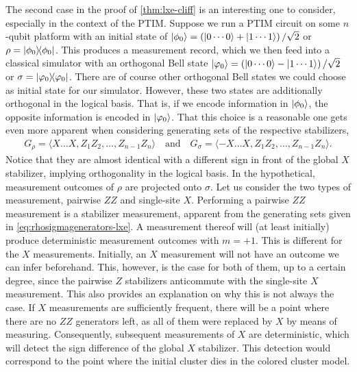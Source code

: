 The second case in the proof of \cref{thm:lxe-cliff} is an interesting one to
consider, especially in the context of the PTIM. Suppose we run a PTIM circuit
on some $n$-qubit platform with an initial state of $\ket{\phi_0} = \left( \ket{0\cdots 0} +
\ket{1\cdots 1} \right) / \sqrt{2}$ or $\rho = \dyad{\phi_0}$. This produces a measurement record, which we
then feed into a classical simulator with an orthogonal Bell state
$\ket{\varphi_0} = \left( \ket{0\cdots 0} - \ket{1\cdots 1} \right) / \sqrt{2}$
or $\sigma = \dyad{\varphi_0}$.
There are of course other orthogonal Bell states we could choose as initial
state for our simulator. However, these two states are additionally orthogonal
in the logical basis. That is, if we encode information in $\ket{\phi_0}$, the
opposite information is encoded in $\ket{\varphi_0}$. That this choice is a
reasonable one gets even more apparent when considering generating sets of the
respective stabilizers,
\begin{align}\label{eq:rhosigmagenerators-lxe}
  G_\rho = \langle X\ldots X, Z_1Z_2,\ldots,Z_{n-1}Z_n\rangle \quad{\text{and}}
  \quad
  G_\sigma = \langle -X\ldots X, Z_1Z_2,\ldots,Z_{n-1}Z_n\rangle
.\end{align}
Notice that they are almost identical with a different sign in front of the
global $X$ stabilizer, implying orthogonality in the logical basis. In the
hypothetical, measurement outcomes of $\rho$ are projected onto $\sigma$.
Let us consider the two types of measurement, pairwise $ZZ$ and single-site
$X$. Performing a pairwise $ZZ$ measurement is a stabilizer measurement,
apparent from the generating sets given in \cref{eq:rhosigmagenerators-lxe}. A
measurement thereof will (at least initially) produce deterministic measurement
outcomes with $m = +1$. This is different for the $X$ measurements. Initially,
an $X$ measurement will not have an outcome we can infer beforehand. This,
however, is the case for both of them, up to a certain degree, since the
pairwise $Z$ stabilizers anticommute with the single-site $X$ measurement. This
also provides an explanation on why this is not always the case. If $X$
measurements are sufficiently frequent, there will be a point where there are
no $ZZ$ generators left, as all of them were replaced by $X$ by means of
measuring. Consequently, subsequent measurements of $X$ are deterministic,
which will detect the sign difference of the global $X$ stabilizer. This
detection would correspond to the point where the initial cluster dies in the
colored cluster model.


